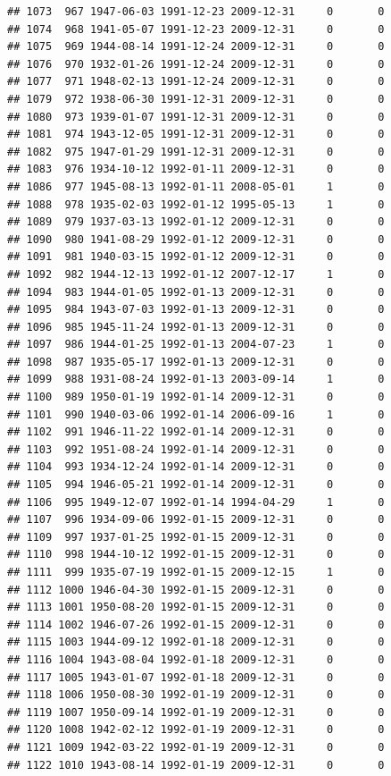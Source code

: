 \documentclass[
]{book}
\theoremstyle{definition}
\theoremstyle{definition}
\theoremstyle{definition}
\theoremstyle{definition}
\theoremstyle{remark}
\begin{document}
\begin{verbatim}
## 1073  967 1947-06-03 1991-12-23 2009-12-31     0       0
## 1074  968 1941-05-07 1991-12-23 2009-12-31     0       0
## 1075  969 1944-08-14 1991-12-24 2009-12-31     0       0
## 1076  970 1932-01-26 1991-12-24 2009-12-31     0       0
## 1077  971 1948-02-13 1991-12-24 2009-12-31     0       0
## 1079  972 1938-06-30 1991-12-31 2009-12-31     0       0
## 1080  973 1939-01-07 1991-12-31 2009-12-31     0       0
## 1081  974 1943-12-05 1991-12-31 2009-12-31     0       0
## 1082  975 1947-01-29 1991-12-31 2009-12-31     0       0
## 1083  976 1934-10-12 1992-01-11 2009-12-31     0       0
## 1086  977 1945-08-13 1992-01-11 2008-05-01     1       0
## 1088  978 1935-02-03 1992-01-12 1995-05-13     1       0
## 1089  979 1937-03-13 1992-01-12 2009-12-31     0       0
## 1090  980 1941-08-29 1992-01-12 2009-12-31     0       0
## 1091  981 1940-03-15 1992-01-12 2009-12-31     0       0
## 1092  982 1944-12-13 1992-01-12 2007-12-17     1       0
## 1094  983 1944-01-05 1992-01-13 2009-12-31     0       0
## 1095  984 1943-07-03 1992-01-13 2009-12-31     0       0
## 1096  985 1945-11-24 1992-01-13 2009-12-31     0       0
## 1097  986 1944-01-25 1992-01-13 2004-07-23     1       0
## 1098  987 1935-05-17 1992-01-13 2009-12-31     0       0
## 1099  988 1931-08-24 1992-01-13 2003-09-14     1       0
## 1100  989 1950-01-19 1992-01-14 2009-12-31     0       0
## 1101  990 1940-03-06 1992-01-14 2006-09-16     1       0
## 1102  991 1946-11-22 1992-01-14 2009-12-31     0       0
## 1103  992 1951-08-24 1992-01-14 2009-12-31     0       0
## 1104  993 1934-12-24 1992-01-14 2009-12-31     0       0
## 1105  994 1946-05-21 1992-01-14 2009-12-31     0       0
## 1106  995 1949-12-07 1992-01-14 1994-04-29     1       0
## 1107  996 1934-09-06 1992-01-15 2009-12-31     0       0
## 1109  997 1937-01-25 1992-01-15 2009-12-31     0       0
## 1110  998 1944-10-12 1992-01-15 2009-12-31     0       0
## 1111  999 1935-07-19 1992-01-15 2009-12-15     1       0
## 1112 1000 1946-04-30 1992-01-15 2009-12-31     0       0
## 1113 1001 1950-08-20 1992-01-15 2009-12-31     0       0
## 1114 1002 1946-07-26 1992-01-15 2009-12-31     0       0
## 1115 1003 1944-09-12 1992-01-18 2009-12-31     0       0
## 1116 1004 1943-08-04 1992-01-18 2009-12-31     0       0
## 1117 1005 1943-01-07 1992-01-18 2009-12-31     0       0
## 1118 1006 1950-08-30 1992-01-19 2009-12-31     0       0
## 1119 1007 1950-09-14 1992-01-19 2009-12-31     0       0
## 1120 1008 1942-02-12 1992-01-19 2009-12-31     0       0
## 1121 1009 1942-03-22 1992-01-19 2009-12-31     0       0
## 1122 1010 1943-08-14 1992-01-19 2009-12-31     0       0

\end{verbatim}
\end{document}
